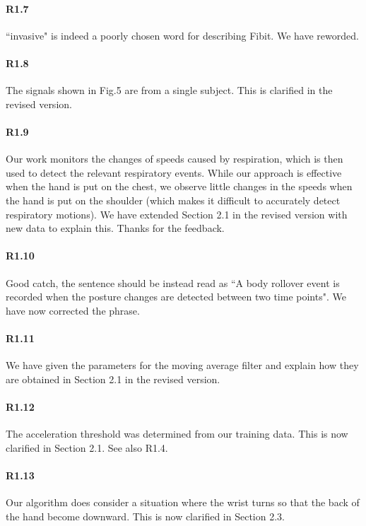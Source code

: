 \paragraph{R1.7} ``invasive" is indeed a poorly chosen word for describing Fibit. We have reworded.
\vspace{-2mm}
\paragraph{R1.8} The signals shown in Fig.5 are from a single subject. This is clarified in the revised version.

\paragraph{R1.9} Our work monitors the changes of speeds caused by respiration, which is then used to detect the relevant respiratory events.
While our approach is effective when the hand is put on the chest, we observe little changes in the speeds when the hand is put on the
shoulder (which makes it difficult to accurately detect respiratory motions). We have extended Section 2.1 in the revised version with new
data to explain this. Thanks for the feedback.

\paragraph{R1.10} Good catch, the sentence should be instead read as ``A body rollover event is recorded when the posture changes are detected between
two time points". We have now corrected the phrase.

\paragraph{R1.11} We have given the parameters for the moving average filter and explain how they are obtained in Section 2.1 in the revised version.

\paragraph{R1.12} The acceleration threshold was determined from our training data. This is now clarified in Section 2.1. See also
R1.4.

\vspace{-2mm}
\paragraph{R1.13} Our algorithm does consider a situation where the wrist turns so that the back of the hand become downward. This is now clarified in Section 2.3.

